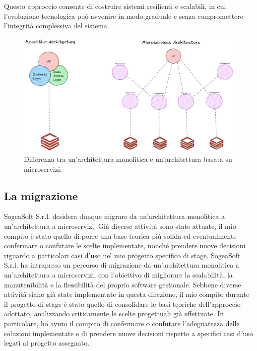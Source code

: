         Questo approccio consente di costruire sistemi resilienti e scalabili, in cui l'evoluzione tecnologica può avvenire in modo graduale e senza compromettere l'integrità complessiva del sistema.

        \begin{figure}[H]
            \centering
            \includegraphics[width=0.9\linewidth]{BCS-Tessi/images/Monolith-Microservices.png}
            \caption[Differenza tra un sistema monolitico e uno a microservizi]{Differenza tra un'architettura monolitica e un'architettura basata su microservizi.}
            \label{fig:monolith-vs-microservices}
        \end{figure}

        \subsection{La migrazione}
        SogeaSoft S.r.l. desidera dunque migrare da un'architettura monolitica a un'architettura a microservizi. Già diverse attività sono state attuate, il mio compito è stato quello di porre una base teorica più solida ed eventualmente confermare o confutare le scelte implementate, nonché prendere nuove decisioni riguardo a particolari casi d'uso nel mio progetto specifico di stage. 
        SogeaSoft S.r.l. ha intrapreso un percorso di migrazione da un'architettura monolitica a un'architettura a microservizi, con l'obiettivo di migliorare la scalabilità, la manutenibilità e la flessibilità del proprio software gestionale. Sebbene diverse attività siano già state implementate in questa direzione, il mio compito durante il progetto di stage è stato quello di consolidare le basi teoriche dell'approccio adottato, analizzando criticamente le scelte progettuali già effettuate. In particolare, ho avuto il compito di confermare o confutare l'adeguatezza delle soluzioni implementate e di prendere nuove decisioni rispetto a specifici casi d'uso legati al progetto assegnato.  

